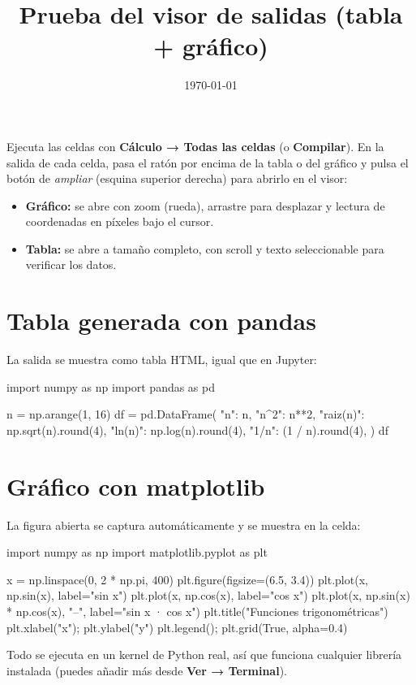 \documentclass[11pt]{article}
\title{Prueba del visor de salidas (tabla + gráfico)}
\author{}
\date{\today}
\begin{document}
\maketitle

Ejecuta las celdas con \textbf{Cálculo → Todas las celdas} (o
\textbf{Compilar}). En la salida de cada celda, pasa el ratón por encima de la
tabla o del gráfico y pulsa el botón de \emph{ampliar} (esquina superior
derecha) para abrirlo en el visor:

\begin{itemize}
  \item \textbf{Gráfico:} se abre con zoom (rueda), arrastre para desplazar y
        lectura de coordenadas en píxeles bajo el cursor.
  \item \textbf{Tabla:} se abre a tamaño completo, con scroll y texto
        seleccionable para verificar los datos.
\end{itemize}

\section{Tabla generada con pandas}
La salida se muestra como tabla HTML, igual que en Jupyter:

import numpy as np
import pandas as pd

n = np.arange(1, 16)
df = pd.DataFrame({
    "n": n,
    "n^2": n**2,
    "raiz(n)": np.sqrt(n).round(4),
    "ln(n)": np.log(n).round(4),
    "1/n": (1 / n).round(4),
})
df

\section{Gráfico con matplotlib}
La figura abierta se captura automáticamente y se muestra en la celda:

import numpy as np
import matplotlib.pyplot as plt

x = np.linspace(0, 2 * np.pi, 400)
plt.figure(figsize=(6.5, 3.4))
plt.plot(x, np.sin(x), label="sin x")
plt.plot(x, np.cos(x), label="cos x")
plt.plot(x, np.sin(x) * np.cos(x), "--", label="sin x · cos x")
plt.title("Funciones trigonométricas")
plt.xlabel("x"); plt.ylabel("y")
plt.legend(); plt.grid(True, alpha=0.4)

\medskip
Todo se ejecuta en un kernel de Python real, así que funciona cualquier
librería instalada (puedes añadir más desde \textbf{Ver → Terminal}).
\end{document}
